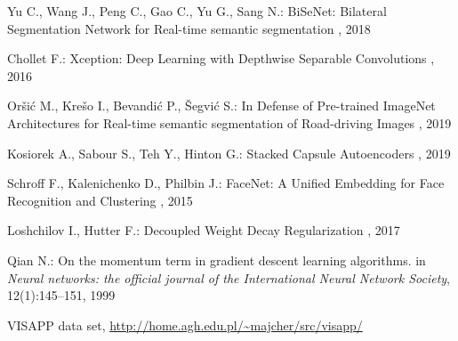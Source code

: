 \documentclass{article}
\begin{document}
\begin{thebibliography}{1}
Yu C., Wang J., Peng C., Gao C., Yu G., Sang N.:
\newblock BiSeNet: Bilateral Segmentation Network for Real-time semantic segmentation
, 2018

Chollet F.:
\newblock Xception: Deep Learning with Depthwise Separable Convolutions
, 2016

Oršić M., Krešo I., Bevandić P., Šegvić S.:
\newblock In Defense of Pre-trained ImageNet Architectures for Real-time semantic segmentation of Road-driving Images
, 2019

Kosiorek A., Sabour S., Teh Y., Hinton G.:
\newblock Stacked Capsule Autoencoders
, 2019


Schroff F., Kalenichenko D., Philbin J.:
\newblock FaceNet: A Unified Embedding for Face Recognition and Clustering
, 2015


Loshchilov I., Hutter F.:
\newblock Decoupled Weight Decay Regularization
, 2017

Qian N.:
\newblock On the momentum term in gradient descent learning algorithms.
\newblock in {\em Neural networks: the official journal of the International Neural Network Society}, 12(1):145–151, 1999

VISAPP data set, 
\newblock \url{http://home.agh.edu.pl/~majcher/src/visapp/}


\end{thebibliography}
\end{document}
